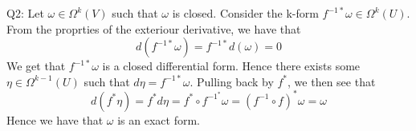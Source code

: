 \documentclass[letterpaper]{article}
\begin{document}
\noindent Q2: Let $\omega \in \Omega^k(V)$ such that $\omega$ is closed. Consider the k-form $f^{-1*}\omega \in \Omega^k(U)$. From the proprties of the exteriour derivative, we have that 
$$d(f^{-1*}\omega) = f^{-1*}d(\omega)=0$$ 
We get that $f^{-1*}\omega$ is a closed differential form. Hence there exists some $\eta\in \Omega^{k-1}(U)$ such that $d\eta =f^{-1*} \omega$. Pulling back by $f^{*}$, we then see that 
$$d(f^{*}\eta)=f^{*}d \eta = f^{*} \circ f^{-1^*}\omega = (f^{-1}\circ f)^{*}\omega = \omega$$
Hence we have that $\omega$ is an exact form.  
\end{document}
